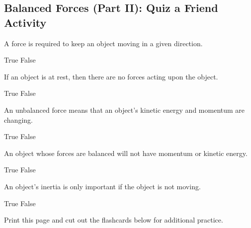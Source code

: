 \documentclass[answers]{exam}
\begin{document}
\clearpage

\subsection*{Balanced Forces (Part II): Quiz a Friend Activity}

\begin{questions}

\question
A force is required to keep an object moving in a given direction.

\begin{randomizechoices}[norandomize]
    \choice True
    \correctchoice False
\end{randomizechoices}

\question
If an object is at rest, then there are no forces acting upon the object.

\begin{randomizechoices}[norandomize]
    \choice True
    \correctchoice False
\end{randomizechoices}

\question
An unbalanced force means that an object's kinetic energy and momentum are changing.

\begin{randomizechoices}[norandomize]
    \correctchoice True
    \choice False
\end{randomizechoices}

\question
An object whose forces are balanced will not have momentum or kinetic energy.

\begin{randomizechoices}[norandomize]
    \choice True
    \correctchoice False
\end{randomizechoices}

\question
An object's inertia is only important if the object is not moving.

\begin{randomizechoices}[norandomize]
    \choice True
    \correctchoice False
\end{randomizechoices}

\clearpage

\question
Print this page and cut out the flashcards below for additional practice.


\end{questions}
\end{document}

